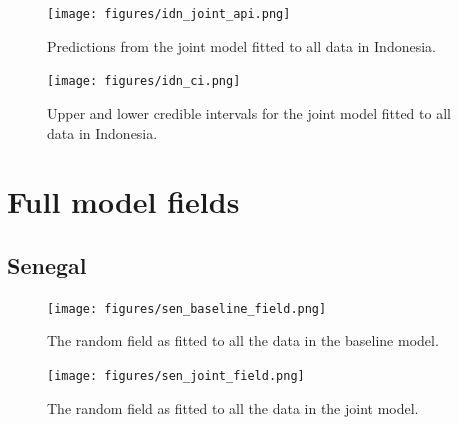 \documentclass[10pt,a4]{article}
\begin{document}
\begin{figure}[h!]
\centering

\texttt{[image: figures/idn\_joint\_api.png]}

\caption{Predictions from the joint model fitted to all data in Indonesia.}
\label{jointidn}
\end{figure}



\begin{figure}[h!]
\centering

\texttt{[image: figures/idn\_ci.png]}

\caption{Upper and lower credible intervals for the joint model fitted to all data in Indonesia.}
\label{jointmdgci}
\end{figure}






\clearpage

\section{Full model fields}


\subsection{Senegal}




\begin{figure}[h!]
\centering

\texttt{[image: figures/sen\_baseline\_field.png]}

\caption{The random field as fitted to all the data in the baseline model.}
\label{baselinefieldsen}
\end{figure}


\begin{figure}[h!]
     \centering
     \label{gpsencov}
\end{figure}


\begin{figure}[h!]
\centering

\texttt{[image: figures/sen\_joint\_field.png]}

\caption{The random field as fitted to all the data in the joint model.}
\label{jointfieldsen}
\end{figure}
\end{document}
